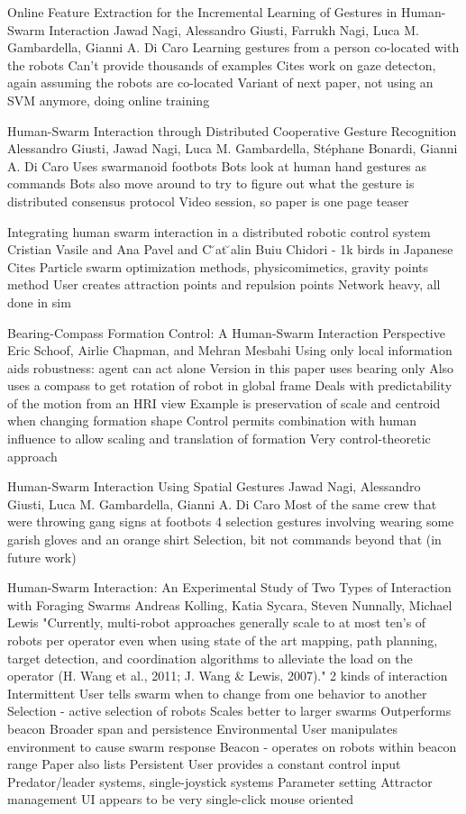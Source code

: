 Online Feature Extraction for the Incremental Learning of Gestures in Human-Swarm Interaction
Jawad Nagi, Alessandro Giusti, Farrukh Nagi, Luca M. Gambardella, Gianni A. Di Caro
	Learning gestures from a person co-located with the robots
	Can't provide thousands of examples
	Cites work on gaze detecton, again assuming the robots are co-located
	Variant of next paper, not using an SVM anymore, doing online training

Human-Swarm Interaction through Distributed Cooperative Gesture Recognition
Alessandro Giusti, Jawad Nagi, Luca M. Gambardella, Stéphane Bonardi, Gianni A. Di Caro
	Uses swarmanoid footbots
	Bots look at human hand gestures as commands
	Bots also move around to try to figure out what the gesture is
		distributed consensus protocol
	Video session, so paper is one page teaser

Integrating human swarm interaction in a distributed robotic control system
Cristian Vasile and Ana Pavel and C ̆at ̆alin Buiu
	Chidori - 1k birds in Japanese
	Cites Particle swarm optimization methods, physicomimetics, gravity points method
	User creates attraction points and repulsion points
	Network heavy, all done in sim

Bearing-Compass Formation Control: A Human-Swarm Interaction Perspective
Eric Schoof, Airlie Chapman, and Mehran Mesbahi
	Using only local information aids robustness: agent can act alone
	Version in this paper uses bearing only
	Also uses a compass to get rotation of robot in global frame
	Deals with predictability of the motion from an HRI view
		Example is preservation of scale and centroid when changing formation shape
	Control permits combination with human influence to allow scaling and translation of formation
	Very control-theoretic approach

Human-Swarm Interaction Using Spatial Gestures
Jawad Nagi, Alessandro Giusti, Luca M. Gambardella, Gianni A. Di Caro
	Most of the same crew that were throwing gang signs at footbots
	4 selection gestures involving wearing some garish gloves and an orange shirt
	Selection, bit not commands beyond that (in future work)

Human-Swarm Interaction: An Experimental Study of Two Types of Interaction with Foraging Swarms
Andreas Kolling, Katia Sycara, Steven Nunnally, Michael Lewis
	"Currently, multi-robot approaches generally scale to at most ten’s of robots per operator even when using state of the art mapping, path planning, target detection, and coordination algorithms to alleviate the load on the operator (H. Wang et al., 2011; J. Wang \& Lewis, 2007)."
	2 kinds of interaction
		Intermittent
			User tells swarm when to change from one behavior to another
			Selection - active selection of robots
				Scales better to larger swarms
				Outperforms beacon
					Broader span and persistence
		Environmental
			User manipulates environment to cause swarm response
			Beacon - operates on robots within beacon range
	Paper also lists
		Persistent
			User provides a constant control input
				Predator/leader systems, single-joystick systems
		Parameter setting
			Attractor management
	UI appears to be very single-click mouse oriented

